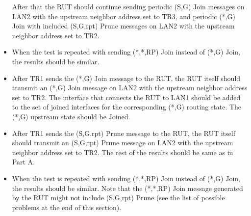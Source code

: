 \documentclass[11pt]{report}
\begin{document}
\begin{itemize}
  After that the RUT should continue sending periodic (S,G) Join messages on
  LAN2 with the upstream neighbor address set to TR3, and periodic (*,G) Join
  with included (S,G,rpt) Prune messages on LAN2 with the upstream neighbor
  address set to TR2.

  \item When the test is repeated with sending (*,*,RP) Join instead of (*,G)
  Join, the results should be similar.

\end{itemize}


\begin{itemize}

  \item After TR1 sends the (*,G) Join message to the RUT, the RUT itself
  should transmit an (*,G) Join message on LAN2 with the upstream neighbor
  address set to TR2. The interface that connects the RUT to LAN1 should be
  added to the set of joined interfaces for the corresponding (*,G) routing
  state. The (*,G) upstream state should be Joined.

  \item After TR1 sends the (S,G,rpt) Prune message to the RUT, the RUT itself
  should transmit an (S,G,rpt) Prune message on LAN2 with the upstream
  neighbor address set to TR2. The rest of the results should be same as in
  Part A.

  \item When the test is repeated with sending (*,*,RP) Join instead of (*,G)
  Join, the results should be similar.
  Note that the (*,*,RP) Join message generated by the RUT might not include
  (S,G,rpt) Prune (see the list of possible problems at the end of this
  section).

\end{itemize}

\end{document}
